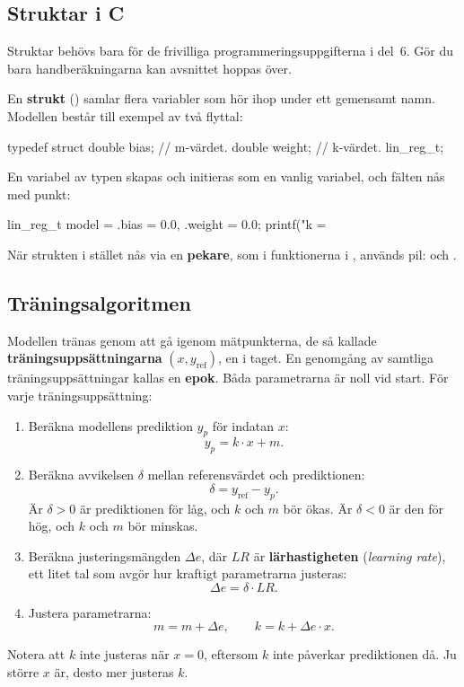 \subsection*{Struktar i C}
Struktar behövs bara för de frivilliga programmeringsuppgifterna i del~6. Gör du bara
handberäkningarna kan avsnittet hoppas över.

En \textbf{strukt} () samlar flera variabler som hör ihop under ett gemensamt namn. Modellen består till exempel av två
flyttal:
\begin{ccode}
typedef struct
{
    double bias;   // m-värdet.
    double weight; // k-värdet.
} lin_reg_t;
\end{ccode}
En variabel av typen  skapas och initieras som en vanlig variabel, och fälten nås
med punkt:
\begin{ccode}
lin_reg_t model = {.bias = 0.0, .weight = 0.0};
printf("k = %
\end{ccode}
När strukten i stället nås via en \textbf{pekare}, som i funktionerna i ,
används pil:  och .

\subsection*{Träningsalgoritmen}
Modellen tränas genom att gå igenom mätpunkterna, de så kallade
\textbf{träningsuppsättningarna} $(x, y_{\text{ref}})$, en i taget. En genomgång av samtliga
träningsuppsättningar kallas en \textbf{epok}. Båda parametrarna är noll vid start. För varje
träningsuppsättning:
\begin{enumerate}
  \item Beräkna modellens prediktion $y_p$ för indatan $x$:
    \[
      y_p = k \cdot x + m.
    \]
  \item Beräkna avvikelsen $\delta$ mellan referensvärdet och prediktionen:
    \[
      \delta = y_{\text{ref}} - y_p.
    \]
    Är $\delta > 0$ är prediktionen för låg, och $k$ och $m$ bör ökas. Är $\delta < 0$ är den
    för hög, och $k$ och $m$ bör minskas.
  \item Beräkna justeringsmängden $\Delta e$, där $\mathit{LR}$ är \textbf{lärhastigheten}
    (\emph{learning rate}), ett litet tal som avgör hur kraftigt parametrarna justeras:
    \[
      \Delta e = \delta \cdot \mathit{LR}.
    \]
  \item Justera parametrarna:
    \[
      m = m + \Delta e, \qquad k = k + \Delta e \cdot x.
    \]
\end{enumerate}
Notera att $k$ inte justeras när $x = 0$, eftersom $k$ inte påverkar prediktionen då. Ju större
$x$ är, desto mer justeras $k$.

